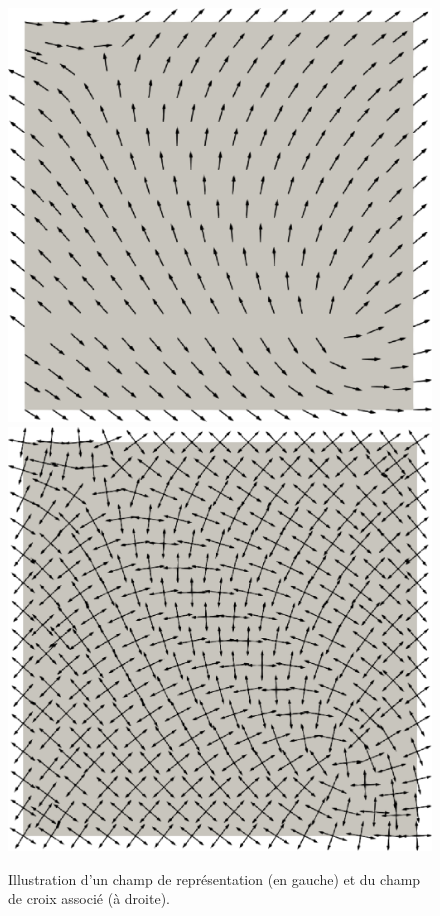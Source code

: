 \begin{figure}[!h]
  \centering
  \includegraphics[scale=0.28]{images/repre_field.pdf}\hspace{0.5cm}
  \includegraphics[scale=0.28]{images/cross_from_repre_field.pdf}
  \caption{Illustration d'un champ de représentation (en gauche) et du champ de croix associé (à droite).}
  \label{fig:repr_to_cross}
\end{figure}

